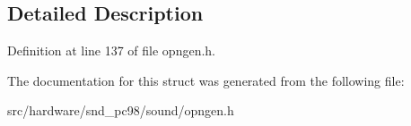 \subsection{Detailed Description}


Definition at line 137 of file opngen.\-h.



The documentation for this struct was generated from the following file\-:\begin{DoxyCompactItemize}
\item 
src/hardware/snd\-\_\-pc98/sound/opngen.\-h\end{DoxyCompactItemize}
